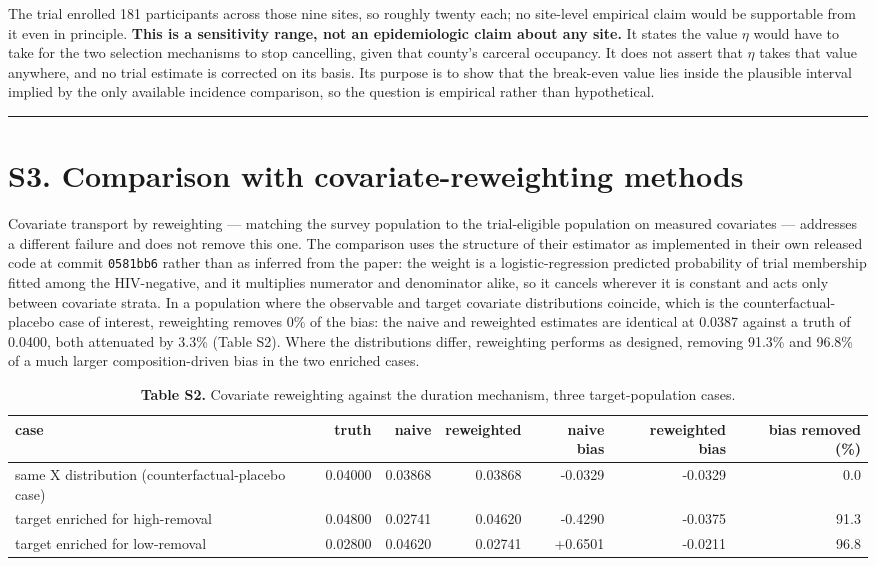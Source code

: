 The trial enrolled 181 participants across those nine sites, so roughly twenty each; no site-level empirical claim would be supportable from it even in principle. \textbf{This is a sensitivity range, not an epidemiologic claim about any site.} It states the value \(\eta\) would have to take for the two selection mechanisms to stop cancelling, given that county's carceral occupancy. It does not assert that \(\eta\) takes that value anywhere, and no trial estimate is corrected on its basis. Its purpose is to show that the break-even value lies inside the plausible interval implied by the only available incidence comparison, so the question is empirical rather than hypothetical.

\begin{center}\rule{0.5\linewidth}{0.5pt}\end{center}

\section{S3. Comparison with covariate-reweighting methods}

Covariate transport by reweighting --- matching the survey population to the trial-eligible population on measured covariates --- addresses a different failure and does not remove this one. The comparison uses the structure of their estimator as implemented in their own released code at commit \texttt{0581bb6} rather than as inferred from the paper: the weight is a logistic-regression predicted probability of trial membership fitted among the HIV-negative, and it multiplies numerator and denominator alike, so it cancels wherever it is constant and acts only between covariate strata. In a population where the observable and target covariate distributions coincide, which is the counterfactual-placebo case of interest, reweighting removes 0\% of the bias: the naive and reweighted estimates are identical at 0.0387 against a truth of 0.0400, both attenuated by 3.3\% (Table S2). Where the distributions differ, reweighting performs as designed, removing 91.3\% and 96.8\% of a much larger composition-driven bias in the two enriched cases.

\begin{table}[htbp]
  \centering
  \small
  \caption*{\textbf{Table S2.} Covariate reweighting against the duration mechanism, three target-population cases.}
  \label{tab:table_s2}
  \begin{tabular}{lrrrrrr}
    \toprule
    case & truth & naive & reweighted & naive bias & reweighted bias & bias removed (\%) \\
    \midrule
    same X distribution (counterfactual-placebo case) & 0.04000 & 0.03868 & 0.03868 & -0.0329 & -0.0329 & 0.0 \\
    target enriched for high-removal & 0.04800 & 0.02741 & 0.04620 & -0.4290 & -0.0375 & 91.3 \\
    target enriched for low-removal & 0.02800 & 0.04620 & 0.02741 & +0.6501 & -0.0211 & 96.8 \\
    \bottomrule
  \end{tabular}
\end{table}

